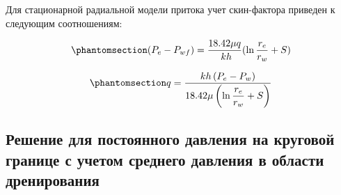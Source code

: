 \documentclass[
  russian,
  letterpaper,
  DIV=11,
  numbers=noendperiod,
  oneside]{scrartcl}
\begin{document}
Для стационарной радиальной модели притока учет скин-фактора приведен к
следующим соотношениям:

\begin{equation}\phantomsection\label{eq-dupui_skin_1}{ 
(P_e - P_{wf}) = \frac{18.42\mu q }{\ k h}(\ln\frac{r_e}{r_w}+S) 
}\end{equation}

\begin{equation}\phantomsection\label{eq-dupui_skin_2}{ 
q=\frac{kh\left(P_e-P_w\right)}{ 18.42 \mu\left(\ln{\dfrac{r_e}{r_w}} + S\right)}
}\end{equation}

\subsection{Решение для постоянного давления на круговой границе с
учетом среднего давления в области
дренирования}\label{ux440ux435ux448ux435ux43dux438ux435-ux434ux43bux44f-ux43fux43eux441ux442ux43eux44fux43dux43dux43eux433ux43e-ux434ux430ux432ux43bux435ux43dux438ux44f-ux43dux430-ux43aux440ux443ux433ux43eux432ux43eux439-ux433ux440ux430ux43dux438ux446ux435-ux441-ux443ux447ux435ux442ux43eux43c-ux441ux440ux435ux434ux43dux435ux433ux43e-ux434ux430ux432ux43bux435ux43dux438ux44f-ux432-ux43eux431ux43bux430ux441ux442ux438-ux434ux440ux435ux43dux438ux440ux43eux432ux430ux43dux438ux44f}
\end{document}
